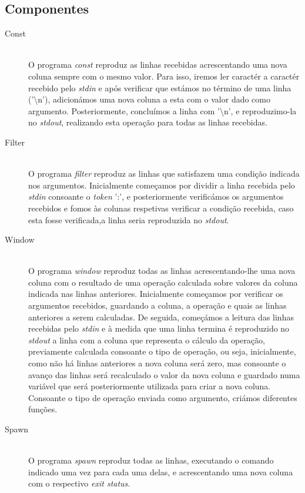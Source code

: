 \documentclass[12pt]{article}
\begin{document}
\subsection{Componentes} 
\begin{description} 
\item[Const] \hfill \\
O programa \textit{const} reproduz as linhas recebidas acrescentando uma nova coluna sempre com o mesmo valor. Para isso, iremos ler caractér a caractér recebido pelo \textit{stdin} e após verificar que estámos no término de uma linha ('\textbackslash n'), adicionámos uma nova coluna a esta com o valor dado como argumento. Posteriormente, concluímos a linha com '\textbackslash n', e reproduzimo-la no \textit{stdout}, realizando esta operação para todas as linhas recebidas. 

\item[Filter] \hfill \\
O programa \textit{filter} reproduz as linhas que satisfazem uma condição indicada nos argumentos. Inicialmente começamos por dividir a linha recebida pelo \textit{stdin} consoante o \textit{token} ':', e posteriormente verificámos os argumentos recebidos e fomos às colunas respetivas verificar a condição recebida, caso esta fosse verificada,a linha seria reproduzida no \textit{stdout}.

\item[Window] \hfill \\
O programa \textit{window} reproduz todas as linhas acrescentando-lhe uma nova coluna com o resultado de uma operação calculada sobre valores da coluna indicada nas linhas anteriores. Inicialmente começamos por verificar os argumentos recebidos, guardando a coluna, a operação e quais as linhas anteriores a serem calculadas. De seguida, começámos a leitura das linhas recebidas pelo \textit{stdin} e à medida que uma linha termina é reproduzido no \textit{stdout} a linha com a coluna que representa o cálculo da operação, previamente calculada consoante o tipo de operação, ou seja, inicialmente, como não há linhas anteriores a nova coluna será zero, mas consoante o avanço das linhas será recalculado o valor da nova coluna e guardado numa variável que será posteriormente utilizada para criar a nova coluna. Consoante o tipo de operação enviada como argumento, criámos diferentes funções.

\item[Spawn] \hfill \\
O programa \textit{spawn} reproduz todas as linhas, executando o comando indicado uma vez para cada uma delas, e acrescentando uma nova coluna com o respectivo \textit{exit status}. 

\end{description} 
\end{document}
